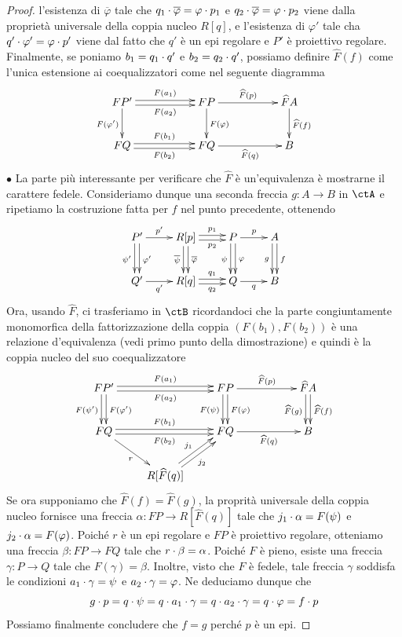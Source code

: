 \begin{proof}
 l'esistenza di \(\overline{\varphi}\) tale che \(q_1 \cdot \overline{\varphi} = \varphi \cdot p_1\) e \(q_2 \cdot \overline{\varphi} = \varphi \cdot p_2\)
 viene dalla proprietà universale della coppia nucleo \(R[q]\), e l'esistenza di \(\varphi'\) tale cha \(q' \cdot \varphi' = \varphi \cdot p'\)
 viene dal fatto che \(q'\) è un epi regolare e \(P'\) è proiettivo regolare. Finalmente, se poniamo \(b_1 = q_1 \cdot q'\) e \(b_2 = q_2 \cdot q'\),
 possiamo definire \(\widehat{F}(f)\) come l'unica estensione ai coequalizzatori come nel seguente diagramma
 \[\xymatrix{FP' \ar[d]_{F(\varphi')} \ar@<0.5ex>[rr]^-{F(a_1)} \ar@<-0.5ex>[rr]_-{F(a_2)} & & FP \ar[d]^{F(\varphi)} \ar[rr]^-{\widehat{F}(p)}
  & & \widehat{F}A \ar[d]^{\widehat{F}(f)} \\
  FQ \ar@<0.5ex>[rr]^-{F(b_1)} \ar@<-0.5ex>[rr]_-{F(b_2)} & & FQ \ar[rr]_-{\widehat{F}(q)} & & B}\]
 \(\bullet\) La parte più interessante per verificare che \(\widehat{F}\) è un'equivalenza è mostrarne il carattere fedele. Consideriamo
 dunque una seconda freccia \(g \colon A \to B\) in \(\ctA\) e ripetiamo la costruzione fatta per \(f\) nel punto precedente, ottenendo
 \[\xymatrix{P' \ar@<0.5ex>[d]^{\varphi'} \ar@<-0.5ex>[d]_{\psi'} \ar[r]^-{p'} &
  R[p] \ar@<0.5ex>[r]^-{p_1} \ar@<-0.5ex>[r]_-{p_2} \ar@<0.5ex>[d]^{\overline{\varphi}} \ar@<-0.5ex>[d]_{\overline{\psi}}
  & P \ar[r]^-{p} \ar@<0.5ex>[d]^{\varphi} \ar@<-0.5ex>[d]_{\psi} & A \ar@<0.5ex>[d]^{f} \ar@<-0.5ex>[d]_{g} \\
  Q' \ar[r]_-{q'} & R[q] \ar@<0.5ex>[r]^-{q_1} \ar@<-0.5ex>[r]_-{q_2} & Q \ar[r]_{q} & B}\]
 Ora, usando \(\widehat{F}\),  ci trasferiamo in \(\ctB\) ricordandoci che la parte congiuntamente monomorfica della fattorizzazione della
 coppia \((F(b_1),F(b_2))\) è una relazione d'equivalenza (vedi primo punto della dimostrazione) e quindi è la coppia nucleo del suo
 coequalizzatore
 \[\xymatrix{FP' \ar@<0.5ex>[d]^{F(\varphi')} \ar@<-0.5ex>[d]_{F(\psi')} \ar@<0.5ex>[rr]^-{F(a_1)} \ar@<-0.5ex>[rr]_-{F(a_2)} & &
  FP \ar@<0.5ex>[d]^{F(\varphi)} \ar@<-0.5ex>[d]_{F(\psi)} \ar[rr]^-{\widehat{F}(p)}
  & & \widehat{F}A \ar@<0.5ex>[d]^{\widehat{F}(f)} \ar@<-0.5ex>[d]_{\widehat{F}(g)} \\
  FQ \ar@<0.5ex>[rr]^-{F(b_1)} \ar@<-0.5ex>[rr]_-{F(b_2)} \ar[rd]_{r} & & FQ \ar[rr]_-{\widehat{F}(q)} & & B \\
  & R[\widehat{F}(q)] \ar@<0.5ex>[ru]^{j_1} \ar@<-0.5ex>[ru]_{j_2} }\]
 Se ora supponiamo che \(\widehat{F}(f) = \widehat{F}(g)\), la proprità universale della coppia nucleo fornisce una freccia
 \(\alpha \colon FP \to R[\widehat{F}(q)]\) tale che \(j_1 \cdot \alpha = F(\psi)\) e \(j_2 \cdot \alpha = F(\varphi)\). Poiché \(r\) è un epi
 regolare e \(FP\) è proiettivo regolare, otteniamo una freccia \(\beta \colon FP \to FQ\) tale che \(r \cdot \beta = \alpha\). Poiché
 \(F\) è pieno, esiste una freccia \(\gamma \colon P \to Q\) tale che \(F(\gamma)=\beta\). Inoltre, visto che \(F\) è fedele, tale freccia
 \(\gamma\) soddisfa le condizioni \(a_1 \cdot \gamma = \psi\) e \(a_2 \cdot \gamma = \varphi\). Ne deduciamo dunque che
 \[g \cdot p = q \cdot \psi = q \cdot a_1 \cdot \gamma = q \cdot a_2 \cdot \gamma = q \cdot \varphi = f \cdot p\]
 Possiamo finalmente concludere che \(f = g\) perché \(p\) è un epi.
\end{proof}


